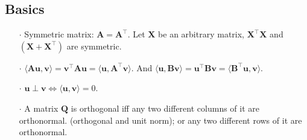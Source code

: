 \documentclass[a4paper, 11pt]{article}
\begin{document}
\subsection{Basics}
\begin{itemize}
	\item[$\cdot$] Symmetric matrix: $\bm{A} = \bm{A}^{\top}$. Let $\bm{X}$ be an arbitrary matrix, $\bm{X}^{\top} \bm{X}$ and $(\bm{X}+\bm{X}^{\top})$ are symmetric.

	\item[$\cdot$] $\langle \bm{Au}, \bm{v} \rangle = \bm{v}^{\top}\bm{Au} = \langle \bm{u}, \bm{A}^{\top}\bm{v} \rangle$. And $\langle \bm{u}, \bm{Bv} \rangle = \bm{u}^{\top}\bm{Bv}=\langle \bm{B}^{\top}\bm{u}, \bm{v} \rangle$. 

	\item[$\cdot$] $\bm{u} \perp \bm{v} \iff \langle \bm{u}, \bm{v} \rangle = 0$.

	\item[$\cdot$] A matrix $\bm{Q}$ is orthogonal iff any two different columns of it are orthonormal. (orthogonal and unit norm); or any two different rows of it are orthonormal.


\end{itemize}
\end{document}
